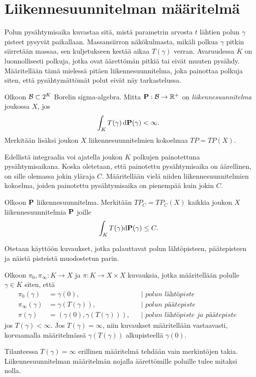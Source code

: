 \documentclass[12pt,oneside,a4paper]{amsbook} %
\begin{document}
\section{Liikennesuunnitelman määritelmä}

Polun pysähtymisaika kuvastaa sitä, mistä parametrin arvosta $t$ lähtien polun $\gamma$ pisteet pysyvät paikallaan. Massansiirron näkökulmasta, mikäli polkua $\gamma$ pitkin siirretään massaa, sen kuljetukseen kestää aikaa $T(\gamma)$ verran. Avaruudessa $K$ on luonnollisesti polkuja, jotka ovat äärettömän pitkiä tai eivät muuten pysähdy. Määritellään tämä mielessä pitäen liikennesuunnitelma, joka painottaa polkuja siten, että pysähtymättömät polut eivät näy tarkastelussa.

\begin{definition}\label{def:liikennesuunnitelma}
    Olkoon $\Borel \subset 2^K$ Borelin sigma-algebra. Mitta $\P: \Borel \to \R^+$ on \textit{liikennesuunnitelma} joukossa $X$, jos
    \begin{equation*}
     \int_K T(\gamma) \, \d \P (\gamma) < \infty.   
    \end{equation*}
    Merkitään lisäksi joukon $X$ liikennesuunnitelmien kokoelmaa $TP = TP(X)$.
\end{definition}

Edellistä integraalia voi ajatella joukon $K$ polkujen painotettuna pysähtymisaikana. Koska oletetaan, että painotettu pysähtymisaika on äärellinen, on sille olemassa jokin yläraja $C$. Määritellään vielä niiden liikennesuunnitelmien kokoelma, joiden painotettu pysähtymisaika on pienempää kuin jokin $C$.

\begin{definition}
    Olkoon $\P$ liikennesuunnitelma. Merkitään $TP_C = TP_C(X)$ kaikkia joukon $X$ liikennesuunnitelmia $\P$ joille
    \begin{equation*}
        \int_K T(\gamma) \d \P(\gamma) \le C.
    \end{equation*}
\end{definition}

Otetaan käyttöön kuvaukset, jotka palauttavat polun lähtöpisteen, päätepisteen ja näistä pisteistä muodostetun parin.

\begin{definition}
    Olkoon $\pi_0, \pi_\infty: K\to X$ ja $\pi:K\to X \times X$ kuvauksia, jotka määritellään polulle $\gamma \in K$ siten, että 
    \begin{align*}
        \pi_0(\gamma) &= \gamma(0), &&\Big| \textit{ polun lähtöpiste }\\
        \pi_\infty(\gamma) &= \gamma(T(\gamma)), &&\Big| \textit{ polun päätepiste }\\
        \pi(\gamma) &= (\gamma(0), \gamma(T(\gamma))), &&\Big| \textit{ polun lähtöpiste ja päätepiste }
    \end{align*}
    jos $T(\gamma) < \infty$. Jos $T(\gamma) = \infty$, niin kuvaukset määritellään vastaavasti, korvaamalla määritelmässä $\gamma(T(\gamma))$ alkupisteellä $\gamma(0).$
\end{definition}
Tilanteessa $T(\gamma) = \infty$ erillinen määritelmä tehdään vain merkintöjen takia. Liikennesuunnitelman määritelmän nojalla äärettömille poluille tulee mitaksi nolla.
\end{document}
